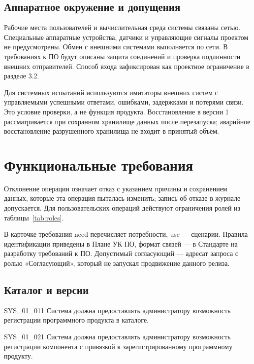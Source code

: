 \documentclass{tpks}
\begin{document}
\subsection{Аппаратное окружение и допущения}

Рабочие места пользователей и вычислительная среда системы связаны сетью.
Специальные аппаратные устройства, датчики и управляющие сигналы проектом не предусмотрены.
Обмен с внешними системами выполняется по сети. В требованиях к ПО будут описаны
защита соединений и проверка подлинности внешних отправителей.
Способ входа зафиксирован как проектное ограничение в разделе 3.2.

Для системных испытаний используются имитаторы внешних систем с управляемыми
успешными ответами, ошибками, задержками и потерями связи. Это условие проверки,
а не функция продукта. Восстановление в версии 1 рассматривается при сохранном
хранилище данных после перезапуска; аварийное восстановление разрушенного хранилища
не входит в принятый объём.

\section{Функциональные требования}\label{sec:functional}

Отклонение операции означает отказ с указанием причины и сохранением данных,
которые эта операция пыталась изменить; запись об отказе в журнале допускается.
Для пользовательских операций действуют ограничения ролей из таблицы~\ref{tab:roles}.

В карточке требования need перечисляет потребности, use --- сценарии. Правила идентификации приведены в Плане УК ПО, формат связей --- в Стандарте на разработку требований к ПО.
Допустимый согласующий --- адресат запроса с ролью «Согласующий»,
который не запускал продвижение данного релиза.

\subsection{Каталог и версии}

\begin{req}{SYS_01_01}{1}
Система должна предоставлять администратору возможность регистрации программного продукта в каталоге.
\end{req}

\begin{req}{SYS_01_02}{1}
Система должна предоставлять администратору возможность регистрации компонента с привязкой к зарегистрированному программному продукту.
\end{req}
\end{document}
